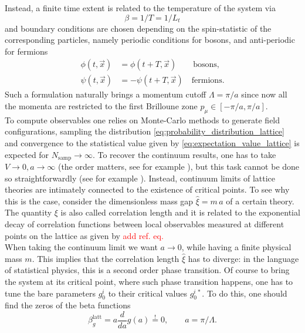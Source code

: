 Instead, a finite time extent is related to the temperature of the system \cite{le_bellac_1996,rothe_LGT} via
\begin{equation*}
    \beta = 1/T = 1/L_t
\end{equation*}
and boundary conditions are chosen depending on the spin-statistic of the corresponding particles, namely periodic conditions for bosons, and anti-periodic for fermions
\begin{equation*}
    \begin{aligned}
        \phi(t, \vec x) &= \phi(t + T, \vec x) \qquad \text{bosons}, \\
        \psi(t, \vec x) &= -\psi(t + T, \vec x) \quad \text{fermions}.
    \end{aligned}
\end{equation*}
Such a formulation naturally brings a momentum cutoff $\Lambda = \pi/a$ since now all the momenta are restricted to the first Brilloune zone $p_\mu \in [-\pi/a, \pi/a]$. \\
To compute observables one relies on Monte-Carlo methods to generate field configurations, sampling the distribution \eqref{eq:probability_distribution_lattice} and convergence to the statistical value given by \eqref{eq:expectation_value_lattice} is expected for $N_\text{samp} \to \infty$. To recover the continuum results, one has to take $V \to 0, a \to \infty$ (the order matters, see for example \cite{seiler}), but this task cannot be done so straightforwardly (see for example \cite{rothe_LGT}).
Instead, continuum limits of lattice theories are intimately connected to the existence of critical points. To see why this is the case, consider the dimensionless mass gap $\hat\xi = m \, a$ of a certain theory. The quantity $\xi$ is also called correlation length and it is related to the exponential decay of correlation functions between local observables measured
at different points on the lattice as given by \textcolor{red}{add ref. eq.}\\
When taking the continuum limit we want $a \to 0$, while having a finite physical mass $m$. This implies that the correlation length $\hat \xi$ has to diverge: in the language of statistical physics, this is a second order phase transition. Of course to bring the system at its critical point, where such phase transition happens, one has to tune the bare parameters $g_0^i$ to their critical values $g_0^{i \, *}$. 
To do this, one should find the zeros of the beta functions
\begin{equation*}
    \beta_g^\text{latt} = a \frac{d}{da} g(a) \overset{!}{=} 0, \qquad a = \pi/\Lambda.
\end{equation*}
